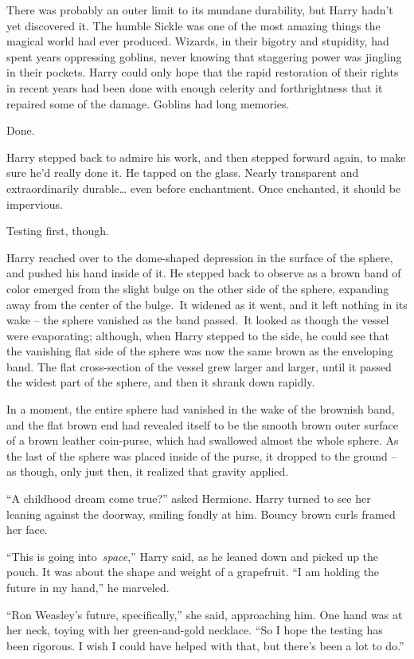 There was probably an outer limit to its mundane durability, but Harry
hadn't yet discovered it. The humble Sickle was one of the most amazing
things the magical world had ever produced. Wizards, in their bigotry
and stupidity, had spent years oppressing goblins, never knowing that
staggering power was jingling in their pockets. Harry could only hope
that the rapid restoration of their rights in recent years had been done
with enough celerity and forthrightness that it repaired some of the
damage. Goblins had long memories.

Done.

Harry stepped back to admire his work, and then stepped forward again,
to make sure he'd really done it. He tapped on the glass. Nearly
transparent and extraordinarily durable\ldots{} even before enchantment.
Once enchanted, it should be impervious.

Testing first, though.

Harry reached over to the dome-shaped depression in the surface of the
sphere, and pushed his hand inside of it. He stepped back to observe as
a brown band of color emerged from the slight bulge on the other side of
the sphere, expanding away from the center of the bulge.~It widened as
it went, and it left nothing in its wake -- the sphere vanished as the
band passed.~It looked as though the vessel were evaporating; although,
when Harry stepped to the side, he could see that the vanishing flat
side of the sphere was now the same brown as the enveloping band. The
flat cross-section of the vessel grew larger and larger, until it passed
the widest part of the sphere, and then it shrank down rapidly.

In a moment, the entire sphere had vanished in the wake of the brownish
band, and the flat brown end had revealed itself to be the smooth brown
outer surface of a brown leather coin-purse, which had swallowed almost
the whole sphere. As the last of the sphere was placed inside of the
purse, it dropped to the ground -- as though, only just then, it
realized that gravity applied.

``A childhood dream come true?'' asked Hermione. Harry turned to see her
leaning against the doorway, smiling fondly at him. Bouncy brown curls
framed her face.

``This is going into~\emph{space},'' Harry said, as he leaned down and
picked up the pouch. It was about the shape and weight of a grapefruit.
``I am holding the future in my hand,'' he marveled.

``Ron Weasley's future, specifically,'' she said, approaching him. One
hand was at her neck, toying with her green-and-gold necklace. ``So I
hope the testing has been rigorous. I wish I could have helped with
that, but there's been a lot to do.''

